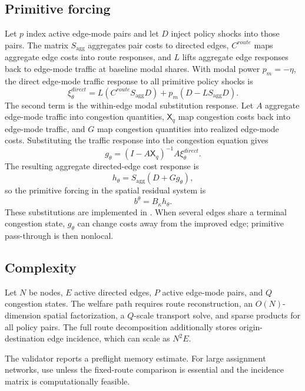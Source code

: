 \subsection{Primitive forcing}

Let \(p\) index active edge-mode pairs and let \(D\) inject policy shocks into
those pairs. The matrix \(S_{\mathrm{agg}}\) aggregates pair costs to directed
edges, \(C^{route}\) maps aggregate edge costs into route responses, and \(L\)
lifts aggregate edge responses back to edge-mode traffic at baseline modal
shares. With modal power \(p_m=-\eta\), the direct edge-mode traffic response
to all primitive policy shocks is
\[
 \xi_{\theta}^{direct}
 =L(C^{route}S_{\mathrm{agg}}D)
  +p_m(D-LS_{\mathrm{agg}}D).
\]
The second term is the within-edge modal substitution response. Let
\(A\) aggregate edge-mode traffic into congestion quantities,
\(\mathsf X_q\) map congestion costs back into edge-mode traffic, and \(G\)
map congestion quantities into realized edge-mode costs. Substituting the
traffic response into the congestion equation gives
\[
 g_\theta
 =(I-A\mathsf X_q)^{-1}A\xi_\theta^{direct}.
\]
The resulting aggregate directed-edge cost response is
\[
 h_\theta=S_{\mathrm{agg}}(D+Gg_\theta),
\]
so the primitive forcing in the spatial residual system is
\[
 b^\theta=B_\kappa h_\theta.
\]
These substitutions are implemented in . When
several edges share a terminal congestion state, \(g_\theta\) can change costs
away from the improved edge; primitive pass-through is then nonlocal.

\subsection{Complexity}

Let \(N\) be nodes, \(E\) active directed edges, \(P\) active edge-mode pairs,
and \(Q\) congestion states. The welfare path requires route reconstruction,
an \(O(N)\)-dimension spatial factorization, a \(Q\)-scale transport solve, and
sparse products for all policy pairs. The full route decomposition
additionally stores origin-destination edge incidence, which can scale as
\(N^2E\).

The validator reports a preflight memory estimate. For large assignment
networks, use  unless the fixed-route comparison is essential and
the incidence matrix is computationally feasible.
